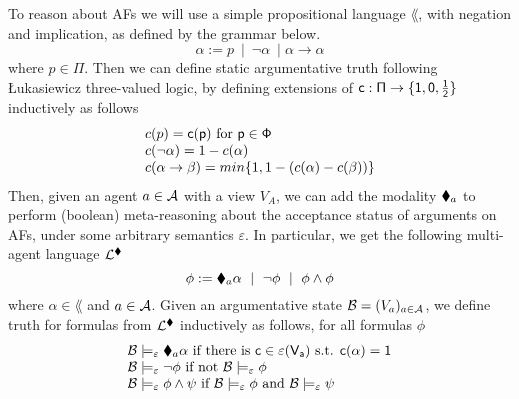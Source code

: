 \documentclass[greybox]{svmult}
\newcommand{\clab}{\sf c}
\newcommand{\views}{\mathcal B}
\newcommand{\sem}{\varepsilon}
\begin{document}
To reason about AFs we will use a simple propositional language $\lang$, with negation and implication, as defined by the grammar below.
$$
\alpha := p \ \mid \ \neg \alpha \ \mid \alpha \to \alpha 
$$
where $p \in \Pi$. Then we can define static argumentative truth following {\L}ukasiewicz three-valued logic, by defining extensions of $\clab: \Pi \to \three$ inductively as follows
\begin{equation}\label{eq:lsem}
\begin{array}{l}
\overline \clab(p) = \clab(p) \text{ for } p \in \Phi \\
\overline \clab(\neg \alpha) = 1 - \overline \clab(\alpha) \\
\overline \clab(\alpha \to \beta) = min\{1,1-(\overline \clab(\alpha) - \overline \clab(\beta))\}
\end{array}
\end{equation}
Then, given an agent $a \in \mathcal A$ with a view $V_A$, we can add the modality $\blacklozenge_a$ to perform (boolean) meta-reasoning about the acceptance status of arguments on AFs, under some arbitrary semantics $\sem$. In particular, we get the following multi-agent language $\mathcal L^{\blacklozenge}$
$$
\phi := \blacklozenge_a \alpha \ \mid \ \neg \phi \ \mid \ \phi \land \phi $$ where $\alpha \in \lang$ and $a \in \mathcal A$. Given an argumentative state $\views = (V_a)_{a\in \agents}$, we define truth for formulas from $\mathcal L^{\blacklozenge}$ inductively as follows, for all formulas $\phi$
\begin{equation}\label{eq:asem}
\begin{array}{l}
\views \models_\sem \cdia_a \alpha \text{ if there is } \clab \in \sem(V_a) \text{ s.t. } \overline \clab(\alpha) = 1 \\
\views \models_\sem \neg \phi \text{ if not } \views \models_\sem \phi \\
\views \models_\sem \phi \land \psi \text{ if } \views \models_\sem \phi \text{ and } \views \models_\sem \psi 
\end{array}
\end{equation}
\end{document}
